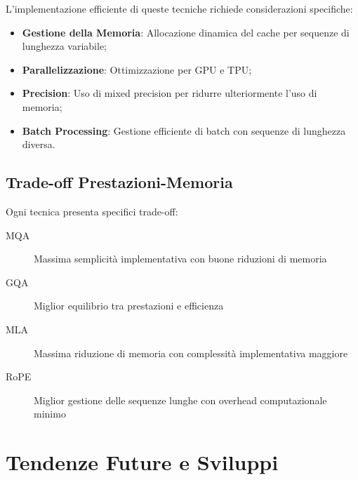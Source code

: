 L'implementazione efficiente di queste tecniche richiede considerazioni specifiche:

\begin{itemize}
    \item \textbf{Gestione della Memoria}: Allocazione dinamica del cache per sequenze di lunghezza variabile;
    \item \textbf{Parallelizzazione}: Ottimizzazione per GPU e TPU;
    \item \textbf{Precision}: Uso di mixed precision per ridurre ulteriormente l'uso di memoria;
    \item \textbf{Batch Processing}: Gestione efficiente di batch con sequenze di lunghezza diversa.
\end{itemize}

\subsection{Trade-off Prestazioni-Memoria}
Ogni tecnica presenta specifici trade-off:

\begin{description}
    \item[MQA] Massima semplicità implementativa con buone riduzioni di memoria
    \item[GQA] Miglior equilibrio tra prestazioni e efficienza
    \item[MLA] Massima riduzione di memoria con complessità implementativa maggiore
    \item[RoPE] Miglior gestione delle sequenze lunghe con overhead computazionale minimo
\end{description}

\section{Tendenze Future e Sviluppi}

